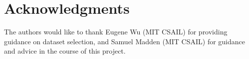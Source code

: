 \documentclass{vldb}
\begin{document}
\section{Acknowledgments}
The authors would like to thank Eugene Wu (MIT CSAIL) for providing guidance on dataset selection, and Samuel Madden (MIT CSAIL) for guidance and advice in the course of this project.






\end{document}
